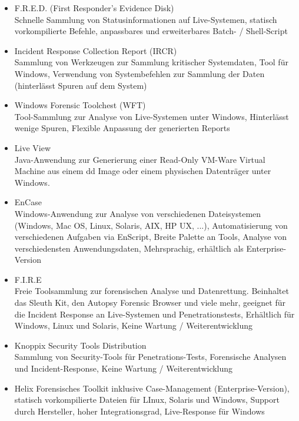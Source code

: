 \begin{itemize}
\item F.R.E.D. (First Responder's Evidence Disk)\\
Schnelle Sammlung von Statusinformationen auf Live-Systemen, statisch vorkompilierte Befehle, anpassbares und erweiterbares Batch- / Shell-Script

\item Incident Response Collection Report (IRCR)\\
Sammlung von Werkzeugen zur Sammlung kritischer Systemdaten, Tool für Windows, Verwendung von Systembefehlen zur Sammlung der Daten (hinterlässt Spuren auf dem System)

\item Windows Forensic Toolchest (WFT)\\
Tool-Sammlung zur Analyse von Live-Systemen unter Windows, Hinterlässt wenige Spuren, Flexible Anpassung der generierten Reports

\item Live View\\
Java-Anwendung zur Generierung einer Read-Only VM-Ware Virtual Machine aus einem dd Image oder einem physischen Datenträger unter Windows.

\item EnCase \\
Windows-Anwendung zur Analyse von verschiedenen Dateisystemen (Windows, Mac OS, Linux, Solaris, AIX, HP UX, ...), Automatisierung von verschiedenen Aufgaben via EnScript, Breite Palette an Tools, Analyse von verschiedensten Anwendungsdaten, Mehrsprachig, erhältlich als Enterprise-Version

\item F.I.R.E\\
Freie Toolsammlung zur forensischen Analyse und Datenrettung. Beinhaltet das Sleuth Kit, den Autopsy Forensic Browser und viele mehr, geeignet für die Incident Response an Live-Systemen und Penetrationstests, Erhältlich für Windows, Linux und Solaris, Keine Wartung / Weiterentwicklung

\item Knoppix Security Tools Distribution\\
Sammlung von Security-Tools für Penetrations-Tests, Forensische Analysen und Incident-Response, Keine Wartung / Weiterentwicklung

\item Helix
Forensisches Toolkit inklusive Case-Management (Enterprise-Version), statisch vorkompilierte Dateien für LInux, Solaris und Windows, Support durch Hersteller, hoher Integrationsgrad, Live-Response für Windows



\end{itemize}
